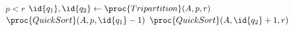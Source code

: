 \begin{codebox}
    \li \If $p < r$
    \li 	\Then
                $\id{q_1},\id{q_2} \gets \proc{Tripartition}(A,p,r)$
    \li 		$\proc{QuickSort}(A,p,\id{q_1}-1)$
    \li 		$\proc{QuickSort}(A,\id{q_2}+1,r)$
            \End
\end{codebox} 